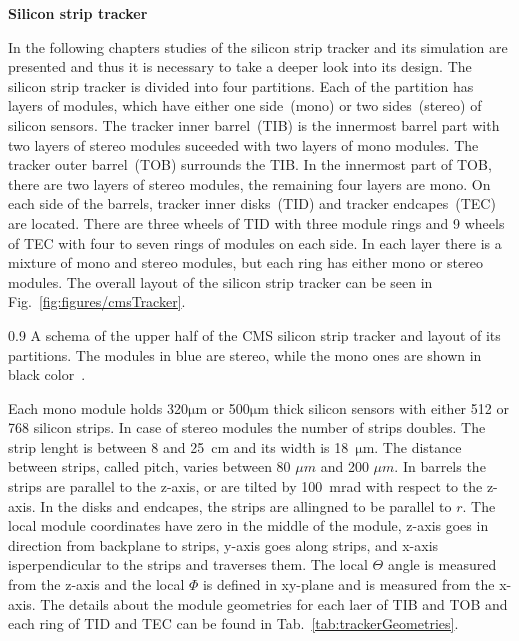 \textbf{Silicon strip tracker}

In the following chapters studies of the silicon strip tracker and its simulation are presented and thus it is necessary to take a deeper look into its design. The silicon strip tracker is divided into four partitions. Each of the partition has layers of modules, which have either one side~(mono) or two sides~(stereo) of silicon sensors. The tracker inner barrel~(TIB) is the innermost barrel part with two layers of stereo modules suceeded with two layers of mono modules. The tracker outer barrel~(TOB) surrounds the TIB. In the innermost part of TOB, there are two layers of stereo modules, the remaining four layers are mono. On each side of the barrels, tracker inner disks~(TID) and tracker endcapes~(TEC) are located. There are three wheels of TID with three module rings and 9 wheels of TEC with four to seven rings of modules on each side. In each layer there is a mixture of mono and stereo modules, but each ring has either mono or stereo modules. The overall layout of the silicon strip tracker can be seen in Fig.~\ref{fig:figures/cmsTracker}.

                 {0.9}       
                 {A schema of the upper half of the CMS silicon strip tracker and layout of its partitions. The modules in blue are stereo, while the mono ones are shown in black color~\cite{Chatrchyan:2014fea}. }

Each mono module holds 320$\mathrm{\mu m}$ or 500$\mathrm{\mu m}$ thick silicon sensors with either 512 or 768 silicon strips. In case of stereo modules the number of strips doubles. The strip lenght is between 8 and 25~cm and its width is 18~$\mathrm{\mu m}$. The distance between strips, called pitch, varies between 80 $\mu m$ and 200 $\mu m$. In barrels the strips are parallel to the z-axis, or are tilted by 100~mrad with respect to the z-axis. In the disks and endcapes, the strips are allingned to be parallel to $r$. The local module coordinates have zero in the middle of the module, z-axis goes in direction from backplane to strips, y-axis goes along strips, and x-axis isperpendicular to the strips and traverses them. The local $\Theta$ angle is measured from the z-axis and the local $\Phi$ is defined in xy-plane and is measured from the x-axis. The details about the module geometries for each laer of TIB and TOB and each ring of TID and TEC can be found in Tab.~\ref{tab:trackerGeometries}.


